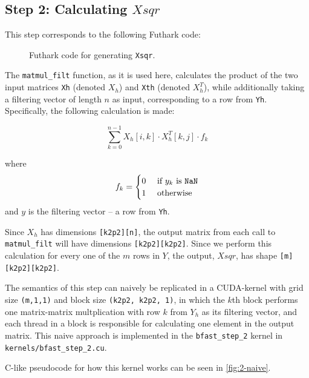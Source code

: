 \subsection{
  Step 2: Calculating \(Xsqr\)
}
This step corresponds to the following Futhark code:
\begin{figure}[H]
    \centering
    \caption{Futhark code for generating \texttt{Xsqr}.}
    \label{fut:kernel2}
\end{figure}

The \texttt{matmul\_filt} function, as it is used here, calculates the product
of the two input matrices \texttt{Xh} (denoted \(X_h\)) and \texttt{Xth}
(denoted \(X^T_h\)), while additionally taking a filtering vector of length
\(n\) as input, corresponding to a row from \texttt{Yh}.
Specifically, the following calculation is made:

\[
  \sum\limits_{k=0}^{n-1} X_h[i,k]\cdot X_h^T[k,j]\cdot f_k
\]

where
\[
  f_k =
  \begin{cases}
    0 & \mbox{ if } y_k \mbox{ is \texttt{NaN}} \\
    1 & \mbox{ otherwise }
  \end{cases}
\]
and \(y\) is the filtering vector -- a row from \texttt{Yh}.

Since \(X_h\) has dimensions \texttt{[k2p2][n]}, the output matrix from each call
to \texttt{matmul\_filt} will have dimensions \texttt{[k2p2][k2p2]}.
Since we perform this calculation for every one of the \(m\) rows in \(Y\), the
output, \(Xsqr\), has shape \texttt{[m][k2p2][k2p2]}.

The semantics of this step can naively be replicated in a CUDA-kernel with grid
size \texttt{(m,1,1)} and block size \texttt{(k2p2, k2p2, 1)}, in which the
\(k\)th block performs one matrix-matrix multplication with row \(k\) from
\(Y_h\) as its filtering vector, and each thread in a block is responsible for
calculating one element in the output matrix.
This naive approach is implemented in the \texttt{bfast\_step\_2} kernel in
\texttt{kernels/bfast\_step\_2.cu}.

C-like pseudocode for how this kernel works can be seen in
\autoref{fig:2-naive}.

